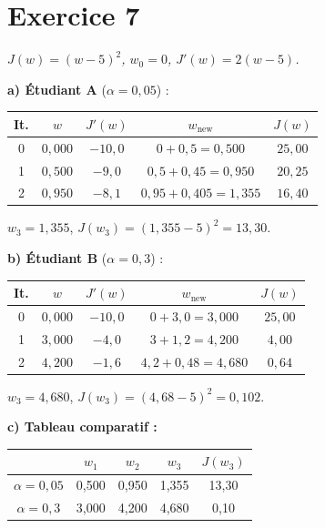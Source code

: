 \section*{Exercice 7 \hfill \exointermediaire}
\textit{$J(w) = (w - 5)^2$, $w_0 = 0$, $J'(w) = 2(w-5)$.}

\separateur

\textbf{a) \'{E}tudiant A} ($\alpha = 0{,}05$) :

\begin{center}
\renewcommand{\arraystretch}{1.2}
\begin{tabular}{c|c|c|c|c}
    \toprule
    It. & $w$ & $J'(w)$ & $w_{\text{new}}$ & $J(w)$ \\
    \midrule
    0 & $0{,}000$ & $-10{,}0$ & $0 + 0{,}5 = 0{,}500$ & $25{,}00$ \\
    1 & $0{,}500$ & $-9{,}0$  & $0{,}5 + 0{,}45 = 0{,}950$ & $20{,}25$ \\
    2 & $0{,}950$ & $-8{,}1$  & $0{,}95 + 0{,}405 = 1{,}355$ & $16{,}40$ \\
    \bottomrule
\end{tabular}
\end{center}

$w_3 = 1{,}355$, $J(w_3) = (1{,}355-5)^2 = \boxed{13{,}30}$.

\textbf{b) \'{E}tudiant B} ($\alpha = 0{,}3$) :

\begin{center}
\renewcommand{\arraystretch}{1.2}
\begin{tabular}{c|c|c|c|c}
    \toprule
    It. & $w$ & $J'(w)$ & $w_{\text{new}}$ & $J(w)$ \\
    \midrule
    0 & $0{,}000$ & $-10{,}0$ & $0 + 3{,}0 = 3{,}000$ & $25{,}00$ \\
    1 & $3{,}000$ & $-4{,}0$  & $3 + 1{,}2 = 4{,}200$ & $4{,}00$ \\
    2 & $4{,}200$ & $-1{,}6$  & $4{,}2 + 0{,}48 = 4{,}680$ & $0{,}64$ \\
    \bottomrule
\end{tabular}
\end{center}

$w_3 = 4{,}680$, $J(w_3) = (4{,}68-5)^2 = \boxed{0{,}102}$.

\textbf{c) Tableau comparatif :}
\begin{center}
\renewcommand{\arraystretch}{1.2}
\begin{tabular}{c|c|c|c|c}
    \toprule
    & $w_1$ & $w_2$ & $w_3$ & $J(w_3)$ \\
    \midrule
    $\alpha = 0{,}05$ & 0{,}500 & 0{,}950 & 1{,}355 & 13{,}30 \\
    $\alpha = 0{,}3$  & 3{,}000 & 4{,}200 & 4{,}680 & 0{,}10 \\
    \bottomrule
\end{tabular}
\end{center}

